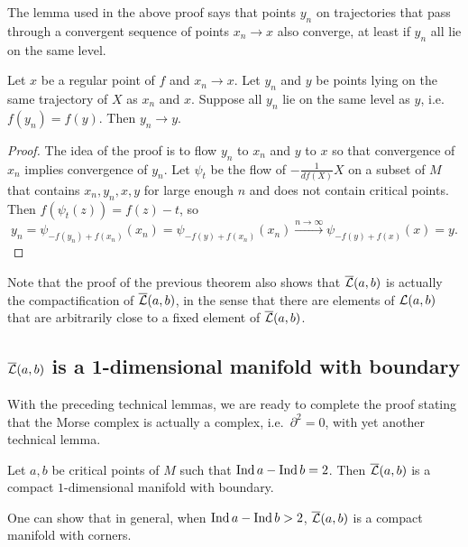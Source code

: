 The lemma used in the above proof says that points $y_n$ on trajectories that pass through a convergent sequence of points $x_n \to x$ also converge, at least if $y_n$ all lie on the same level.
\begin{marginfigure}
    \centering
    \caption{TODO lemma partial squared zero proof}
    \label{fig:lemma-partial-squared-zero-proof}
\end{marginfigure}
\begin{lemma}
    Let $x$ be a regular point of $f$ and $x_n \to x$.
    Let $y_n$ and  $y$ be points lying on the same trajectory of $X$ as  $x_n$ and  $x$.
    Suppose all $y_n$ lie on the same level as  $y$, i.e.  $f(y_n) = f(y)$.
    Then  $y_n \to  y$.
    \label{lemma:level-sets}
\end{lemma}
\begin{proof}
    The idea of the proof is to flow $y_n$ to  $x_n$ and $y$ to $x$ so that convergence of $x_n$ implies convergence of $y_n$.
    Let  $\psi_t$ be the flow of  $-\frac{1}{df (X)} X$ on a subset of $M$ that contains $x_n, y_n, x, y$ for large enough  $n$ and does not contain critical points.
    Then $f(\psi_t(z)) = f(z) - t$, so
     \[
         y_n = \psi_{-f(y_n) + f(x_n)}(x_n) = \psi_{-f(y) + f(x_n)}(x_n) \xrightarrow{n \to \infty}   \psi_{-f(y) + f(x)}(x) = y
    .\] 
\end{proof}

Note that the proof of the previous theorem also shows that $\overline{\mathcal L}(a, b) $ is actually the compactification of  $\overline{\mathcal L}(a, b)$, in the sense that there are elements of  $\mathcal L(a, b)$ that are arbitrarily close to a fixed element of $\overline{\mathcal L}(a, b)$.

\subsection{$\overline{\mathcal L}(a, b)$ is a 1-dimensional manifold with boundary}
With the preceding technical lemmas,
we are ready to complete the proof stating that the Morse complex is actually a complex, i.e.\ $\partial^2 = 0$, with yet another technical lemma.


\begin{theorem}
    Let $a, b$ be critical points of  $M$ such that  $\operatorname{Ind} a - \operatorname{Ind} b = 2$. Then  $\overline{\mathcal L}(a, b)$ is a compact  $1$-dimensional manifold with boundary.
\end{theorem}

\begin{remark}
    One can show that in general, when $\operatorname{Ind} a - \operatorname{Ind} b > 2$,  $\overline{\mathcal L}(a, b)$ is a compact manifold with corners.
\end{remark}

